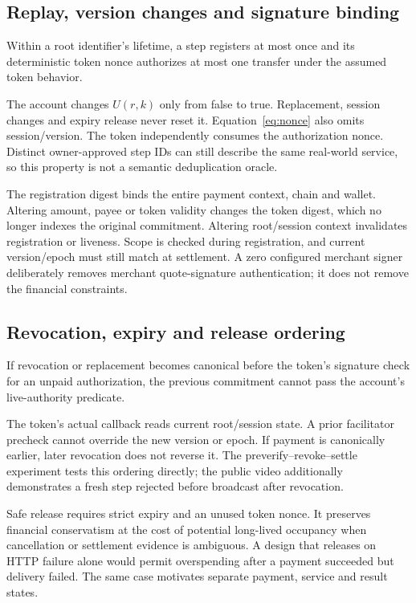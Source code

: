 \subsection{Replay, version changes and signature binding}
\begin{property}
Within a root identifier's lifetime, a step registers at most once and its deterministic token nonce authorizes at most one transfer under the assumed token behavior.
\end{property}
The account changes $U(r,k)$ only from false to true. Replacement, session changes and expiry release never reset it. Equation~\eqref{eq:nonce} also omits session/version. The token independently consumes the authorization nonce. Distinct owner-approved step IDs can still describe the same real-world service, so this property is not a semantic deduplication oracle.

The registration digest binds the entire payment context, chain and wallet. Altering amount, payee or token validity changes the token digest, which no longer indexes the original commitment. Altering root/session context invalidates registration or liveness. Scope is checked during registration, and current version/epoch must still match at settlement. A zero configured merchant signer deliberately removes merchant quote-signature authentication; it does not remove the financial constraints.

\subsection{Revocation, expiry and release ordering}
\begin{property}
If revocation or replacement becomes canonical before the token's signature check for an unpaid authorization, the previous commitment cannot pass the account's live-authority predicate.
\end{property}
The token's actual callback reads current root/session state. A prior facilitator precheck cannot override the new version or epoch. If payment is canonically earlier, later revocation does not reverse it. The preverify--revoke--settle experiment tests this ordering directly; the public video additionally demonstrates a fresh step rejected before broadcast after revocation.

Safe release requires strict expiry and an unused token nonce. It preserves financial conservatism at the cost of potential long-lived occupancy when cancellation or settlement evidence is ambiguous. A design that releases on HTTP failure alone would permit overspending after a payment succeeded but delivery failed. The same case motivates separate payment, service and result states.

